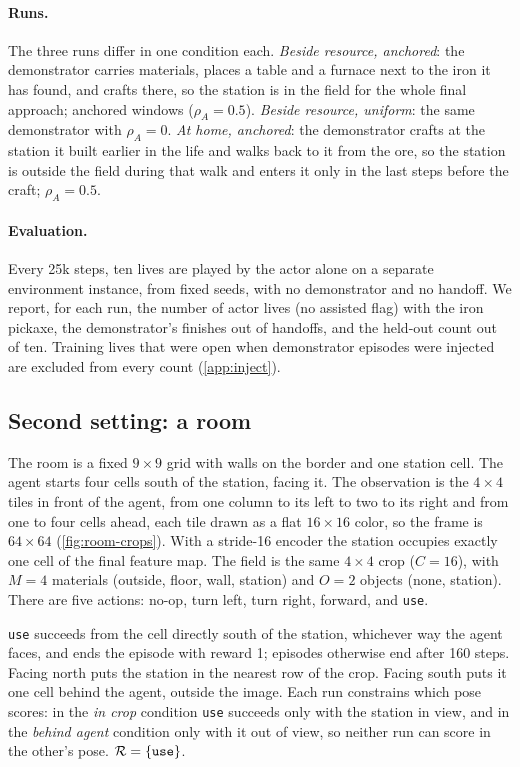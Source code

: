 \paragraph{Runs.}
The three runs differ in one condition each.
\emph{Beside resource, anchored}: the demonstrator carries materials, places a table and a furnace next to the iron it has found, and crafts there, so the station is in the field for the whole final approach; anchored windows ($\rho_A=0.5$).
\emph{Beside resource, uniform}: the same demonstrator with $\rho_A=0$.
\emph{At home, anchored}: the demonstrator crafts at the station it built earlier in the life and walks back to it from the ore, so the station is outside the field during that walk and enters it only in the last steps before the craft; $\rho_A=0.5$.

\paragraph{Evaluation.}
Every 25k steps, ten lives are played by the actor alone on a separate environment instance, from fixed seeds, with no demonstrator and no handoff.
We report, for each run, the number of actor lives (no assisted flag) with the iron pickaxe, the demonstrator's finishes out of handoffs, and the held-out count out of ten.
Training lives that were open when demonstrator episodes were injected are excluded from every count (\cref{app:inject}).

\subsection{Second setting: a room}
\label{sec:setup-room}

The room is a fixed $9\times9$ grid with walls on the border and one station cell.
The agent starts four cells south of the station, facing it.
The observation is the $4\times4$ tiles in front of the agent, from one column to its left to two to its right and from one to four cells ahead, each tile drawn as a flat $16\times16$ color, so the frame is $64\times64$ (\cref{fig:room-crops}).
With a stride-16 encoder the station occupies exactly one cell of the final feature map.
The field is the same $4\times4$ crop ($C=16$), with $M=4$ materials (outside, floor, wall, station) and $O=2$ objects (none, station).
There are five actions: no-op, turn left, turn right, forward, and \texttt{use}.

\texttt{use} succeeds from the cell directly south of the station, whichever way the agent faces, and ends the episode with reward 1; episodes otherwise end after 160 steps.
Facing north puts the station in the nearest row of the crop.
Facing south puts it one cell behind the agent, outside the image.
Each run constrains which pose scores: in the \emph{in crop} condition \texttt{use} succeeds only with the station in view, and in the \emph{behind agent} condition only with it out of view, so neither run can score in the other's pose.
$\mathcal{R} = \{\texttt{use}\}$.

